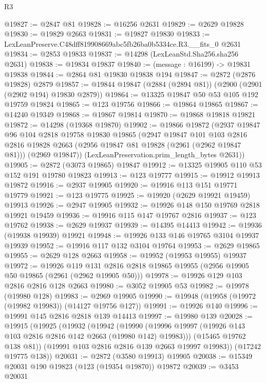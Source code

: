 \begin{lexlean}{R3}
\begin{coremodule}
@19827 := @2847 @81
@19828 := @16256 @2631
@19829 := @2629 @19828
@19830 := @19829 @2663
@19831 := @19827 @19830
@19833 := LexLeanPreserve.C48dff819908669abc5fb26ba0b5334ce.R3.__fits_0 @2631
@19834 := @2853 @19833
@19837 := @14298 (LexLeanStd.Sha256.sha256 @2631)
@19838 := @19834 @19837
@19840 := (message : @16199) -> @19831 @19838
@19844 := @2864 @81 @19830 @19838 @194
@19847 := @2872 (@2876 @19828) @2879
@19857 := @19844 @19847 (@2884 (@2894 @81)) (@2900 (@2901 (@2902 @194) @19830 @2879))
@19864 := @13325 @19847 @50 @53 @105 @192 @19759 @19824
@19865 := @123 @19756
@19866 := @19864 @19865
@19867 := @14240 @19349
@19868 := @19867 @19814
@19870 := @19868 @19818 @19821
@19872 := @14298 (@19368 @19870)
@19902 := @19866
    @19872
    (@2937
      @19847
      @96
      @104
      @2818
      @19758
      @19830
      @19865
      (@2947
        @19847
        @101
        @103
        @2816
        @2816
        @19828
        @2663
        (@2956 @19847 @81 @19828 (@2961 (@2962 @19847 @81)))
        (@2969 @19847))
      (LexLeanPreservation.prim_length_bytes @2631))
@19905 := @2872 (@3073 @19865) @19847
@19912 := @13325 @19905 @110 @53 @152 @191 @19780 @19823
@19913 := @123 @19777
@19915 := @19912 @19913 @19872
@19916 := @2937 @19905
@19920 := @19916 @113 @151 @19771 @19779
@19921 := @123 @19775
@19925 := @19920 (@2629 @19921 @19459) @19913
@19926 := @2947 @19905
@19932 := @19926 @148 @150 @19769 @2818 @19921 @19459
@19936 := @19916 @115 @147 @19767 @2816
@19937 := @123 @19762
@19938 := @2629 @19937
@19939 := @14395 @14413
@19942 := @19936 (@19938 @19939) @19921
@19948 := @19926 @133 @146 @19765 @3104 @19937 @19939
@19952 := @19916 @117 @132 @3104 @19764
@19953 := @2629 @19865
@19955 := @2629 @128 @2663
@19958 := @19952 (@19953 @19955) @19937
@19972 := @19926
    @119
    @131
    @2816
    @2818
    @19865
    @19955
    (@2956 @19905 @50 @19865 (@2961 (@2962 @19905 @50)))
@19978 := @19926 @129 @103 @2816 @2816 @128 @2663
@19980 := @3052 @19905 @53
@19982 := @19978 (@19980 @128)
@19983 := @2969 @19905
@19990 := @19948 (@19958 (@19972 (@19982 @19983)) (@14127 @19756 @127))
@19991 := @19926 @140
@19996 := @19991 @145 @2816 @2818 @139 @14413
@19997 := @19980 @139
@20028 := @19915
    (@19925
      (@19932
        (@19942
          (@19990 (@19996 @19997 (@19926 @143 @103 @2816 @2816 @142 @2663 (@19980 @142) @19983)))
          (@15465 @19762 @138 @81))
        (@19991 @103 @2816 @2816 @139 @2663 @19997 @19983))
      (@17242 @19775 @138))
@20031 := @2872 (@3580 @19913) @19905
@20038 := @15349 @20031 @190 @19823 (@123 (@19354 @19870)) @19872
@20039 := @3453 @20031

\end{coremodule}
\end{lexlean}
